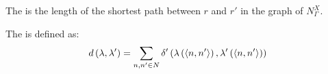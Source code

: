 \begin{defi}
The  is the length of the shortest path between $r$ and $r'$ in the graph of $N_{\Gamma}^X$.
\cite{conf/ijcai/EuzenatLD03}
\end{defi}

\begin{defi}
The  is defined as:
\begin{equation}
d\left(\lambda,\lambda'\right)=\displaystyle\sum_{n,n'\in N}\delta'\left(\lambda\left(\left\langle n,n'\right\rangle\right),\lambda'\left(\left\langle n,n'\right\rangle\right)\right)
\end{equation}
\cite{conf/ijcai/EuzenatLD03}
\end{defi}